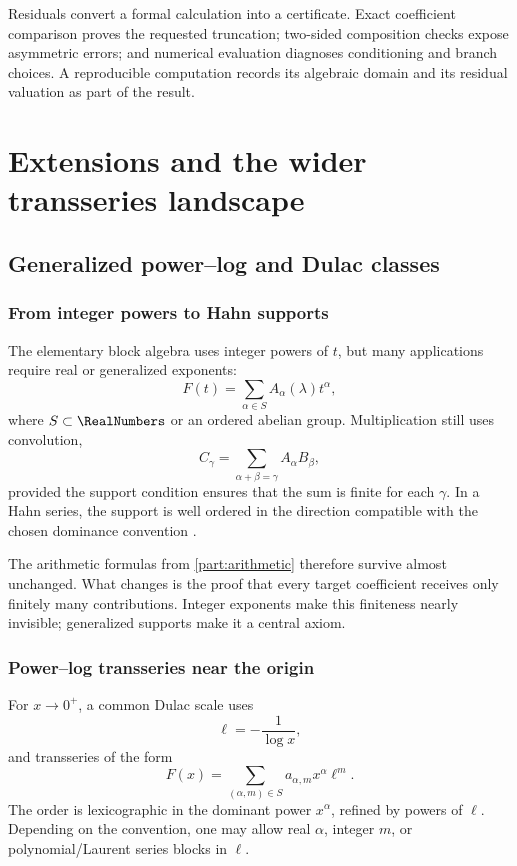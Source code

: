 \documentclass[11pt,openany]{book}
\theoremstyle{definition}
\theoremstyle{plain}
\theoremstyle{remark}
\begin{document}
\begin{summarybox}
Residuals convert a formal calculation into a certificate. Exact coefficient comparison proves the requested truncation; two-sided composition checks expose asymmetric errors; and numerical evaluation diagnoses conditioning and branch choices. A reproducible computation records its algebraic domain and its residual valuation as part of the result.
\end{summarybox}

\part{Extensions and the wider transseries landscape}\label{part:extensions}

\chapter{Generalized power--log and Dulac classes}\label{ch:extensions}

\section{From integer powers to Hahn supports}
The elementary block algebra uses integer powers of \(t\), but many applications require real or generalized exponents:
\begin{equation}\label{eq:Hahn-power-log}
 F(t)=\sum_{\alpha\in S}A_\alpha(\lambda)t^\alpha,
\end{equation}
where \(S\subset\RealNumbers\) or an ordered abelian group. Multiplication still uses convolution,
\[
 C_\gamma=\sum_{\alpha+\beta=\gamma}A_\alpha B_\beta,
\]
provided the support condition ensures that the sum is finite for each \(\gamma\). In a Hahn series, the support is well ordered in the direction compatible with the chosen dominance convention \cite{hahn,vdhoeven-book}.

The arithmetic formulas from \cref{part:arithmetic} therefore survive almost unchanged. What changes is the proof that every target coefficient receives only finitely many contributions. Integer exponents make this finiteness nearly invisible; generalized supports make it a central axiom.


\section{Power--log transseries near the origin}
For \(x\to0^+\), a common Dulac scale uses
\[
 \ell=-\frac1{\log x},
\]
and transseries of the form
\begin{equation}\label{eq:Dulac-general-form}
 F(x)=\sum_{(\alpha,m)\in S}a_{\alpha,m}x^\alpha\ell^m.
\end{equation}
The order is lexicographic in the dominant power \(x^\alpha\), refined by powers of \(\ell\). Depending on the convention, one may allow real \(\alpha\), integer \(m\), or polynomial/Laurent series blocks in \(\ell\).
\end{document}
